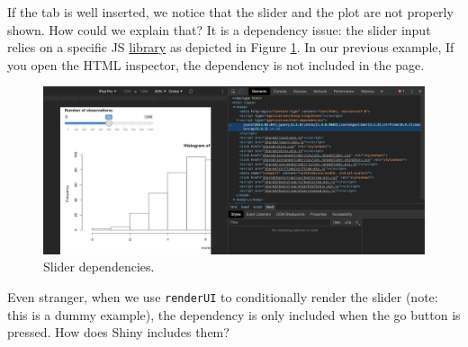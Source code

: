 \documentclass[]{book}
\begin{document}
If the tab is well inserted, we notice that the slider and the plot are not properly shown. How could we explain that? It is a dependency issue: the slider input relies on a specific JS \href{http://ionden.com/a/plugins/ion.rangeSlider/}{library} as depicted in Figure \ref{fig:slider-deps}. In our previous example, If you open the HTML inspector, the dependency is not included in the page.

\begin{figure}
\includegraphics[width=36.03in]{images/practice/slider-deps} \caption{Slider dependencies.}\label{fig:slider-deps}
\end{figure}

Even stranger, when we use \texttt{renderUI} to conditionally render the slider (note: this is a dummy example), the dependency is only included when the go button is pressed. How does Shiny includes them?
\end{document}
